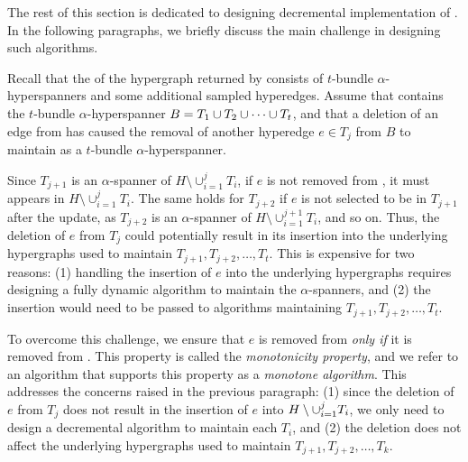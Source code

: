 The rest of this section is dedicated to designing decremental implementation of .
In the following paragraphs, we briefly discuss the main challenge in designing such algorithms.

Recall that the \SpectralHypersparsifier{}  of the hypergraph  returned by  consists of \( t \)-bundle \( \alpha \)-hyperspanners and some additional sampled hyperedges.
Assume that  contains the \( t \)-bundle \( \alpha \)-hyperspanner  \( { B} = { T_1} \cup {\ensuremath{ T_2}} \cup \dots \cup {\ensuremath{ T_t}} \), and that a deletion of an edge from  has caused the removal of another hyperedge \( e \in T_j \) from \( B \) to maintain  as a \( t \)-bundle \( \alpha \)-hyperspanner.

Since \( T_{j+1} \) is an \( \alpha \)-spanner of \( H \setminus \cup _{i = 1} ^j T_i \), if \( e \) is not removed from , it must appears in \( H \setminus \cup _{i = 1} ^j T_i \).
The same holds for \( T_{j+2} \) if \( e \) is not selected to be in \( T_{j+1} \) after the update, as \( T_{j+2} \) is an \( \alpha \)-spanner of \( H \setminus \cup _{i = 1} ^{j + 1} T_i \), and so on.
Thus, the deletion of \( e \) from \( T_j \) could potentially result in its insertion into the underlying hypergraphs used to maintain \( T_{j + 1}, T_{j + 2}, \dots, T_{t} \).
This is expensive for two reasons: (1) handling the insertion of \( e \) into the underlying hypergraphs requires designing a fully dynamic algorithm to maintain the \( \alpha \)-spanners, and (2) the insertion would need to be passed to  algorithms maintaining \( T_{j + 1}, T_{j+2}, \dots, T_{t} \).

To overcome this challenge, we ensure that \( e \) is removed from  \textit{only if} it is removed from .
This property is called the \textit{monotonicity property}, and we refer to an algorithm that supports this property as a \textit{monotone algorithm}.
This addresses the concerns raised in the previous paragraph: (1) since the deletion of \( e \) from \( T_j \) does not result in the insertion of \( e \) into \( { H} \setminus \cup_{i = 1} ^j { T_i}  \), we only need to design a decremental algorithm to maintain each \( T_i \), and (2) the deletion does not affect the underlying hypergraphs used to maintain \( T_{j + 1}, T_{j+2}, \dots, T_{k} \).  




